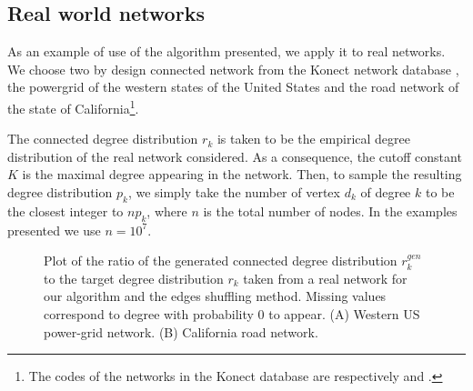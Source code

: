 \documentclass[
11pt, %
english, %
singlespacing, %
nolistspacing, %
liststotoc, %
headsepline, %
]{MastersDoctoralThesis} %
\begin{document}
\subsection{Real world networks}

As an example of use of the algorithm presented, we apply it to real networks. We choose two by design connected network from the Konect network database \cite{kunegis2013konect}, the powergrid of the western states of the United States and the road network of the state of California\footnote{The codes of the networks in the Konect database are respectively  and .}.

The connected degree distribution $r_k$ is taken to be the empirical degree distribution of the real network considered. As a consequence, the cutoff constant $K$ is the maximal degree appearing in the network. Then, to sample the resulting degree distribution $p_k$, we simply take the number of vertex $d_k$ of degree $k$ to be the closest integer to $n p_k$, where $n$ is the total number of nodes. In the examples presented we use $n = 10^7$.

\begin{figure}
	\hfill
	\caption{Plot of the ratio of the generated connected degree distribution $r^{gen}_k$ to the target degree distribution $r_k$ taken from a real network for our algorithm and the edges shuffling method. Missing values correspond to degree with probability $0$ to appear. (A) Western US power-grid network. (B) California road network.}
	\label{Figure: Real examples}
\end{figure}
\end{document}
